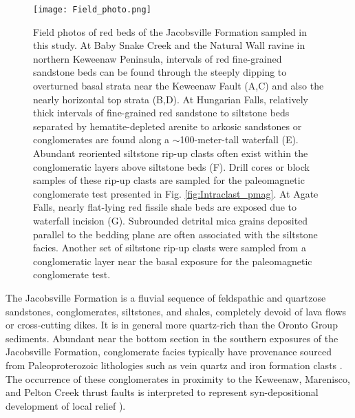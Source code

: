 \documentclass[draft]{agujournal2019}
\begin{document}
\begin{figure}[h!]
\centering
\texttt{[image: Field\_photo.png]}
\caption{\scriptsize Field photos of red beds of the Jacobsville Formation sampled in this study. At Baby Snake Creek and the Natural Wall ravine in northern Keweenaw Peninsula, intervals of red fine-grained sandstone beds can be found through the steeply dipping to overturned basal strata near the Keweenaw Fault (A,C) and also the nearly horizontal top strata (B,D). At Hungarian Falls, relatively thick intervals of fine-grained red sandstone to siltstone beds separated by hematite-depleted arenite to arkosic sandstones or conglomerates are found along a $\sim$100-meter-tall waterfall (E). Abundant reoriented siltstone rip-up clasts often exist within the conglomeratic layers above siltstone beds (F). Drill cores or block samples of these rip-up clasts are sampled for the paleomagnetic conglomerate test presented in Fig. \ref{fig:Intraclast_pmag}. At Agate Falls, nearly flat-lying red fissile shale beds are exposed due to waterfall incision (G). Subrounded detrital mica grains deposited parallel to the bedding plane are often associated with the siltstone facies. Another set of siltstone rip-up clasts were sampled from a conglomeratic layer near the basal exposure for the paleomagnetic conglomerate test. }
\label{fig:Field_photo}
\end{figure}

The Jacobsville Formation is a fluvial sequence of feldspathic and quartzose sandstones, conglomerates, siltstones, and shales, completely devoid of lava flows or cross-cutting dikes. It is in general more quartz-rich than the Oronto Group sediments. Abundant near the bottom section in the southern exposures of the Jacobsville Formation, conglomerate facies typically have provenance sourced from Paleoproterozoic lithologies such as vein quartz and iron formation clasts \cite{Hamblin1958a, Kalliokoski1982a}. The occurrence of these conglomerates in proximity to the Keweenaw, Marenisco, and Pelton Creek thrust faults is interpreted to represent syn-depositional development of local relief \cite{Kalliokoski1982a, Hedgman1992a}). 
\end{document}
